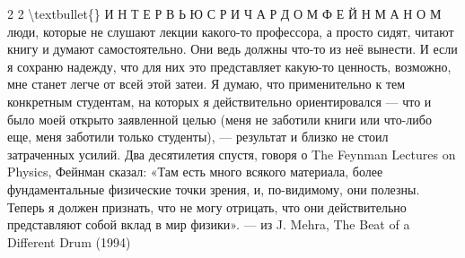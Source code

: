 \documentclass[10pt,oneside]{article}
\begin{document}
2 2 \textbackslash{}textbullet\{\} И Н Т Е Р В Ь Ю  С  Р И Ч А Р Д О М  Ф Е Й Н М А Н О М люди, которые не слушают лекции какого-то профессора, а просто сидят, читают книгу и думают самостоятельно. Они ведь должны что-то из неё вынести. И если я сохраню надежду, что для них это представляет какую-то ценность, возможно, мне станет легче от всей этой затеи. Я думаю, что применительно к тем конкретным студентам, на которых я действительно ориентировался --- что и было моей открыто заявленной целью (меня не заботили книги или что-либо еще, меня заботили только студенты), --- результат и близко не стоил затраченных усилий.\emph{ } Два десятилетия спустя, говоря о The Feynman Lectures on Physics, Фейнман сказал: «Там есть много всякого материала, более фундаментальные физические точки зрения, и, по-видимому, они полезны. Теперь я должен признать, что не могу отрицать, что они действительно представляют собой вклад в мир физики». --- из J. Mehra, The Beat of a Different Drum (1994)\par

\clearpage
{}
\end{document}
